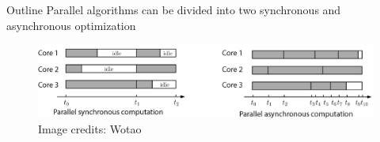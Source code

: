 \documentclass[10pt]{beamer}
\begin{document}
\begin{frame}{Outline}
Parallel algorithms can be divided into two 
synchronous and asynchronous optimization

\begin{figure}
\includegraphics[width=\linewidth]{img/sync_vs_async}
\caption{Image credits: Wotao}
\end{figure}
\end{frame}

% 
% 
% 
% 
% 
% 
% 
% 
% 
% 
% 
\end{document}
